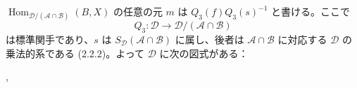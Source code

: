 $\operatorname{Hom}_{\mathcal D/(\mathcal A\cap\mathcal B)}(B,X)$ の任意の元
$m$ は $Q_3(f)Q_3(s)^{-1}$ と書ける。ここで
\[
 Q_3\colon\mathcal D\longrightarrow\mathcal D/(\mathcal A\cap\mathcal B)
\]
は標準関手であり、$s$ は $S_{\mathcal D}(\mathcal A\cap\mathcal B)$ に属し、後者は
$\mathcal A\cap\mathcal B$ に対応する $\mathcal D$ の乗法的系である
(2.2.2)。よって $\mathcal D$ に次の図式がある：
\begin{center}
 \quad ,
\end{center}
\endgroup
